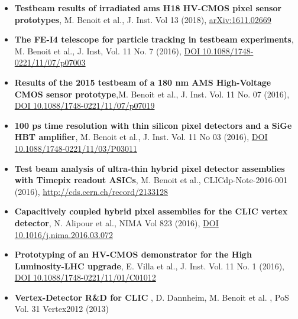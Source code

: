 \begin{itemize}
\item \textbf{Testbeam results of irradiated ams H18 HV-CMOS pixel sensor prototypes}, M. Benoit et al., J. Inst. Vol 13 (2018), \href{https://arxiv.org/abs/1611.02669}{arXiv:1611.02669}\\

\item \textbf{The FE-I4 telescope for particle tracking in testbeam experiments}, M. Benoit et al., J. Inst, Vol. 11 No. 7 (2016),  \href{https://iopscience.iop.org/article/10.1088/1748-0221/11/07/P07003}{DOI 10.1088/1748-0221/11/07/p07003}\\

\item \textbf{Results of the 2015 testbeam of a 180 nm AMS High-Voltage CMOS sensor prototype},M. Benoit et al., J. Inst. Vol. 11 No. 07 (2016), \href{https://iopscience.iop.org/article/10.1088/1748-0221/11/07/P07019}{DOI 10.1088/1748-0221/11/07/p07019}\\

\item \textbf{100 ps time resolution with thin silicon pixel detectors and a SiGe HBT amplifier}, M. Benoit et al., J. Inst. Vol. 11 No 03 (2016), \href{https://iopscience.iop.org/article/10.1088/1748-0221/11/03/P03011/meta}{DOI 10.1088/1748-0221/11/03/P03011}\\

\item \textbf{Test beam analysis of ultra-thin hybrid pixel detector assemblies with Timepix readout ASICs}, M. Benoit et al., CLICdp-Note-2016-001 (2016), \url{http://cds.cern.ch/record/2133128} \\

\item \textbf{Capacitively coupled hybrid pixel assemblies for the CLIC vertex detector}, N. Alipour et al., NIMA Vol 823 (2016), \href{https://www.sciencedirect.com/science/article/pii/S016890021630095X}{DOI 10.1016/j.nima.2016.03.072} \\

\item \textbf{Prototyping of an HV-CMOS demonstrator for the High Luminosity-LHC upgrade}, E. Villa et al., J. Inst. Vol. 11 No. 1 (2016), \href{https://iopscience.iop.org/article/10.1088/1748-0221/11/01/C01012}{DOI 10.1088/1748-0221/11/01/C01012}\\

\item \textbf{Vertex-Detector R\&D for CLIC} , D. Dannheim, M. Benoit et al. , PoS Vol. 31 Vertex2012 (2013)\\


\end{itemize}
